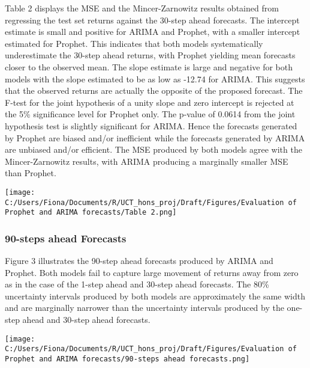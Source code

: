 \documentclass[12pt,a4paper]{article}
\numberwithin{equation}{section}
\numberwithin{figure}{section}
\numberwithin{table}{section}
\let\origfigure\figure
\let\endorigfigure\endfigure
\renewenvironment{figure}[1][2] {
    \expandafter\origfigure\expandafter[H]
} {
    \endorigfigure
}
\begin{document}
Table 2 displays the MSE and the Mincer-Zarnowitz results obtained from
regressing the test set returns against the 30-step ahead forecasts. The
intercept estimate is small and positive for ARIMA and Prophet, with a
smaller intercept estimated for Prophet. This indicates that both models
systematically underestimate the 30-step ahead returns, with Prophet
yielding mean forecasts closer to the observed mean. The slope estimate
is large and negative for both models with the slope estimated to be as
low as -12.74 for ARIMA. This suggests that the observed returns are
actually the opposite of the proposed forecast. The F-test for the joint
hypothesis of a unity slope and zero intercept is rejected at the 5\%
significance level for Prophet only. The p-value of 0.0614 from the
joint hypothesis test is slightly significant for ARIMA. Hence the
forecasts generated by Prophet are biased and/or inefficient while the
forecasts generated by ARIMA are unbiased and/or efficient. The MSE
produced by both models agree with the Mincer-Zarnowitz results, with
ARIMA producing a marginally smaller MSE than Prophet.

\begin{figure}[htbp]
\centering
\texttt{[image: C:/Users/Fiona/Documents/R/UCT\_hons\_proj/Draft/Figures/Evaluation of Prophet and ARIMA forecasts/Table 2.png]}
\caption{Mincer-Zarnowitz results for 30-step ahead forecasts}
\end{figure}

\subsubsection{90-steps ahead Forecasts}\label{steps-ahead-forecasts-1}

Figure 3 illustrates the 90-step ahead forecasts produced by ARIMA and
Prophet. Both models fail to capture large movement of returns away from
zero as in the case of the 1-step ahead and 30-step ahead forecasts. The
80\% uncertainty intervals produced by both models are approximately the
same width and are marginally narrower than the uncertainty intervals
produced by the one-step ahead and 30-step ahead forecasts.

\begin{figure}[htbp]
\centering
\texttt{[image: C:/Users/Fiona/Documents/R/UCT\_hons\_proj/Draft/Figures/Evaluation of Prophet and ARIMA forecasts/90-steps ahead forecasts.png]}
\caption{90-step ahead forecasts from the ARIMA(1,0,0) and Prophet
model}
\end{figure}
\end{document}
